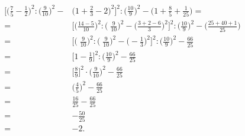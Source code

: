 \begin{exrig}
\begin{esempio}
 \begin{align*}
\bigg[\bigg(\frac{7}{5}-\frac{1}{2}\bigg)^{2}:\bigg(\frac{9}{10}\bigg)^{2}-&\bigg(1+\frac{2}{3}-2\bigg)^{2}\bigg]^{2}:%
\bigg(\frac{10}{9}\bigg)^{2}-\bigg(1+\frac{8}{5}+\frac{1}{25}\bigg)=\\
=&\bigg[\bigg(\frac{14-5}{10}\bigg)^{2}:\bigg(\;\frac{9}{10}\bigg)^{2}-\bigg(\frac{3+2-6}{3}\bigg)^{2}\bigg]^{2}:%
\bigg(\frac{10}{9}\bigg)^{2}-\bigg(\frac{25+40+1}{25}\bigg)\\
=&\bigg[\bigg(\;\frac{9}{10}\bigg)^{2}:\bigg(\;\frac{9}{10}\bigg)^{2}-\bigg(-{\frac{1}{3}}\bigg)^{2}\bigg]^{2}:\bigg(\frac{10}{9}\bigg)^{2}-\frac{66}{25}\\
=&\bigg[1-\frac{1}{9}\bigg]^{2}:\bigg(\frac{10}{9}\bigg)^{2}-\frac{66}{25}\\
=&\bigg[\frac{8}{9}\bigg]^{2}\cdot\bigg(\frac{9}{10}\bigg)^{2}-\frac{66}{25}\\
=&\bigg(\frac{4}{5}\bigg)^{2}-\frac{66}{25}\\
=&\frac{16}{25}-\frac{66}{25}\\
=&-{\frac{50}{25}}\\
=&-2.
\end{align*}
\end{esempio}
\end{exrig}

\vspazio\ovalbox{\risolvii \ref{ese:3.129}, \ref{ese:3.130}, \ref{ese:3.131}, \ref{ese:3.132}, \ref{ese:3.133}, \ref{ese:3.134}, \ref{ese:3.135}, \ref{ese:3.136}, \ref{ese:3.137}, \ref{ese:3.138}, \ref{ese:3.139}}

\newpage

\cleardoublepage
